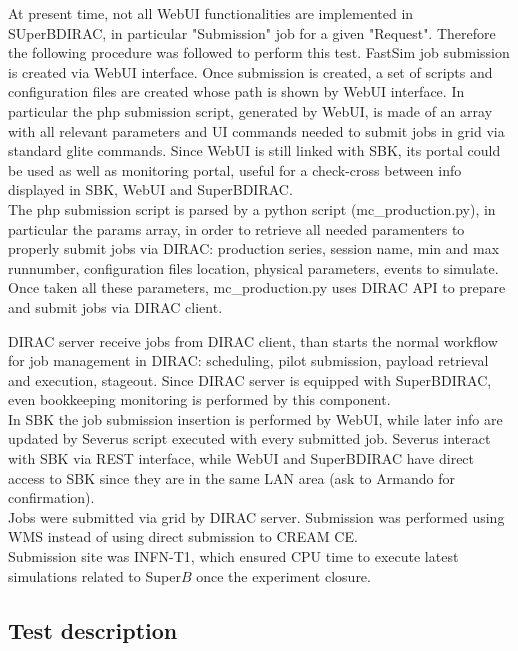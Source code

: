 \documentclass[a4paper]{jpconf}
\begin{document}
At present time, not all WebUI functionalities are implemented in SUperBDIRAC, in particular "Submission" job for a given "Request".
Therefore the following procedure was followed to perform this test. FastSim job submission is created via WebUI interface. Once submission is created, a set of scripts and configuration files are created whose path is shown by WebUI interface. In particular the php submission script, generated by WebUI, is made of an array with all relevant parameters and UI commands needed to submit jobs in grid via standard glite commands.
Since WebUI is still linked with SBK, its portal could be used as well as monitoring portal, useful for a check-cross between info displayed in SBK, WebUI and SuperBDIRAC.\\

The php submission script is parsed by a python script (mc\_production.py), in particular the params array, in order to retrieve all needed paramenters to properly submit jobs via DIRAC: production series, session name, min and max runnumber, configuration files location, physical parameters, events to simulate. Once taken all these parameters, mc\_production.py uses DIRAC API to prepare and submit jobs via DIRAC client.

DIRAC server receive jobs from DIRAC client, than starts the normal workflow for job management in DIRAC: scheduling, pilot submission, payload retrieval and execution, stageout. Since DIRAC server is equipped with SuperBDIRAC, even bookkeeping monitoring is performed by this component.\\

In SBK the job submission insertion is performed by WebUI, while later info are updated by Severus script executed with every submitted job. Severus interact with SBK via REST interface, while WebUI and SuperBDIRAC have direct access to SBK since they are in the same LAN area (ask to Armando for confirmation).\\

Jobs were submitted via grid by DIRAC server. Submission was performed using WMS instead of using direct submission to CREAM CE.\\

Submission site was INFN-T1, which ensured CPU time to execute latest simulations related to Super$B$ once the experiment closure.

\subsection{Test description}
\end{document}
